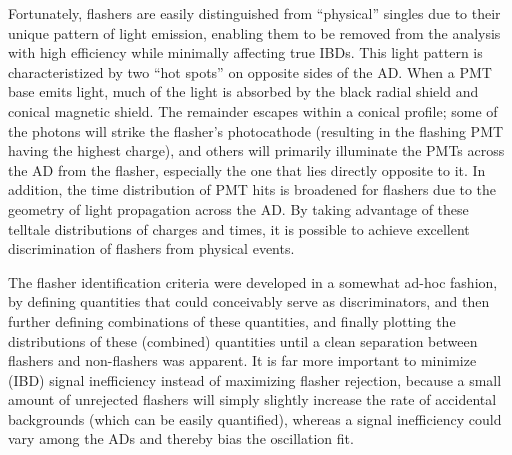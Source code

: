 \documentclass[../thesis.tex]{subfiles}
\begin{document}
Fortunately, flashers are easily distinguished from ``physical'' singles due to
their unique pattern of light emission, enabling them to be removed from the
analysis with high efficiency while minimally affecting true IBDs. This light
pattern is characteristized by two ``hot spots'' on opposite sides of the
AD. When a PMT base emits light, much of the light is absorbed by the black
radial shield and conical magnetic shield. The remainder escapes within a
conical profile; some of the photons will strike the flasher's photocathode
(resulting in the flashing PMT having the highest charge), and others will
primarily illuminate the PMTs across the AD from the flasher, especially the one
that lies directly opposite to it. In addition, the time distribution of PMT
hits is broadened for flashers due to the geometry of light propagation across
the AD. By taking advantage of these telltale distributions of charges and
times, it is possible to achieve excellent discrimination of flashers from
physical events.

The flasher identification criteria were developed in a somewhat ad-hoc fashion,
by defining quantities that could conceivably serve as discriminators, and then
further defining combinations of these quantities, and finally plotting the
distributions of these (combined) quantities until a clean separation between
flashers and non-flashers was apparent. It is far more important to minimize
(IBD) signal inefficiency instead of maximizing flasher rejection, because a
small amount of unrejected flashers will simply slightly increase the rate of
accidental backgrounds (which can be easily quantified), whereas a signal
inefficiency could vary among the ADs and thereby bias the oscillation fit.

\newcommand\fmax{f_{\mathrm{max}}} \newcommand\fquad{f_{\mathrm{quad}}}
\newcommand\fID{f_{\mathrm{ID}}} \newcommand\fPSD{f_{\mathrm{PSD}}}
\end{document}

